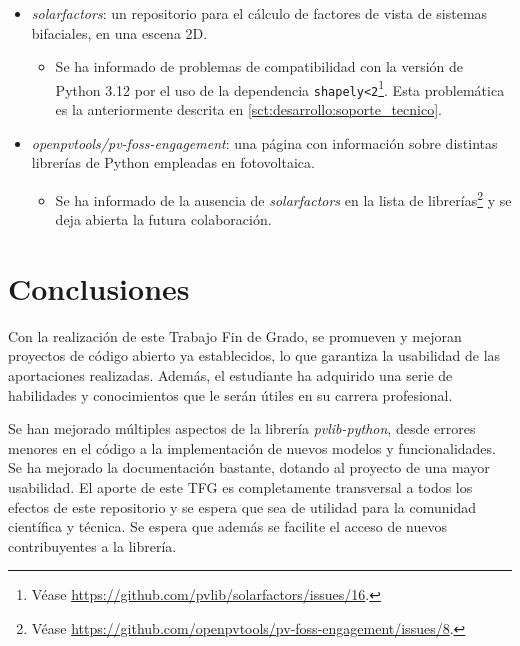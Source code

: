 \begin{itemize}
    \item \textit{solarfactors}: un repositorio para el cálculo de factores de vista de sistemas bifaciales, en una escena 2D.
    \begin{itemize}
        \item Se ha informado de problemas de compatibilidad con la versión de Python 3.12 por el uso de la dependencia \texttt{shapely<2}\footnote{Véase \url{https://github.com/pvlib/solarfactors/issues/16}.}. Esta problemática es la anteriormente descrita en \ref{sct:desarrollo:soporte_tecnico}.
    \end{itemize}
    \item \textit{openpvtools/pv-foss-engagement}: una página con información sobre distintas librerías de Python empleadas en fotovoltaica.
    \begin{itemize}
        \item Se ha informado de la ausencia de \textit{solarfactors} en la lista de librerías\footnote{Véase \url{https://github.com/openpvtools/pv-foss-engagement/issues/8}.} y se deja abierta la futura colaboración.
    \end{itemize}
\end{itemize}


\section{Conclusiones} \label{sct:resultados:conclusiones}

Con la realización de este Trabajo Fin de Grado, se promueven y mejoran proyectos de código abierto ya establecidos, lo que garantiza la usabilidad de las aportaciones realizadas. Además, el estudiante ha adquirido una serie de habilidades y conocimientos que le serán útiles en su carrera profesional.

Se han mejorado múltiples aspectos de la librería \textit{pvlib-python}, desde errores menores en el código a la implementación de nuevos modelos y funcionalidades. Se ha mejorado la documentación bastante, dotando al proyecto de una mayor usabilidad. El aporte de este TFG es completamente transversal a todos los efectos de este repositorio y se espera que sea de utilidad para la comunidad científica y técnica. Se espera que además se facilite el acceso de nuevos contribuyentes a la librería.

